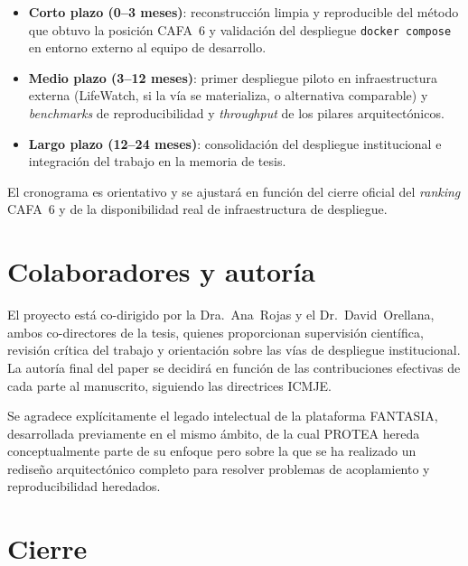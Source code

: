 \documentclass[11pt,a4paper]{article}
\begin{document}
\begin{itemize}[leftmargin=1.5em]
  \item \textbf{Corto plazo (0–3 meses)}: reconstrucción limpia y reproducible
    del método que obtuvo la posición CAFA~6 y validación del despliegue
    \texttt{docker compose} en entorno externo al equipo de desarrollo.
  \item \textbf{Medio plazo (3–12 meses)}: primer despliegue piloto en
    infraestructura externa (LifeWatch, si la vía se materializa, o
    alternativa comparable) y \emph{benchmarks} de reproducibilidad y
    \emph{throughput} de los pilares arquitectónicos.
  \item \textbf{Largo plazo (12–24 meses)}: consolidación del despliegue
    institucional e integración del trabajo en la memoria de tesis.
\end{itemize}

El cronograma es orientativo y se ajustará en función del cierre oficial del
\emph{ranking} CAFA~6 y de la disponibilidad real de infraestructura de
despliegue.

\section{Colaboradores y autoría}

El proyecto está co-dirigido por la Dra.~Ana~Rojas y el Dr.~David~Orellana,
ambos co-directores de la tesis, quienes proporcionan supervisión científica,
revisión crítica del trabajo y orientación sobre las vías de despliegue
institucional. La autoría final del paper se decidirá en función de las
contribuciones efectivas de cada parte al manuscrito, siguiendo las directrices
ICMJE.

Se agradece explícitamente el legado intelectual de la plataforma FANTASIA,
desarrollada previamente en el mismo ámbito, de la cual PROTEA hereda
conceptualmente parte de su enfoque pero sobre la que se ha realizado un
rediseño arquitectónico completo para resolver problemas de acoplamiento y
reproducibilidad heredados.

\section{Cierre}
\end{document}
